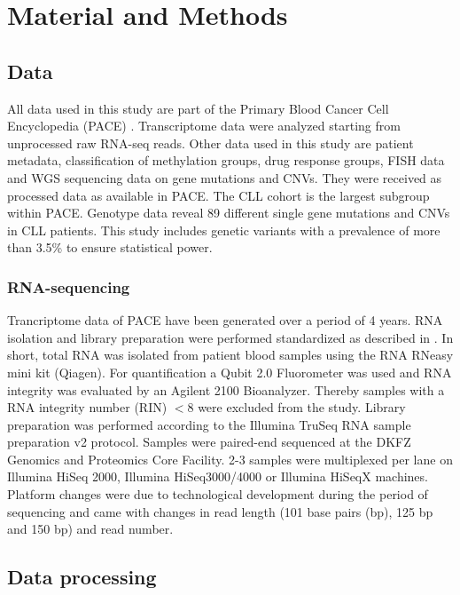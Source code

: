 

\section{Material and Methods}

\subsection{Data}
All data used in this study are part of the Primary Blood Cancer Cell Encyclopedia (PACE) \citep{Dietrich}. Transcriptome data were analyzed starting from unprocessed raw RNA-seq reads. Other data used in this study are patient metadata, classification of methylation groups, drug response groups, FISH data and WGS sequencing data on gene mutations and CNVs. They were received as processed data as available in PACE. The CLL cohort is the largest subgroup within PACE. Genotype data reveal 89 different single gene mutations and CNVs in CLL patients. This study includes genetic variants with a prevalence of more than 3.5\% to ensure statistical power.

\subsubsection{RNA-sequencing}
Trancriptome data of PACE have been generated over a period of 4 years. RNA isolation and library preparation were performed standardized as described in \citet{Dietrich}. In short, total RNA was isolated from patient blood samples using the RNA RNeasy mini kit (Qiagen). For quantification a Qubit 2.0 Fluorometer was used and RNA integrity was evaluated by an Agilent 2100 Bioanalyzer. Thereby samples with a RNA integrity number (RIN) $< 8$ were excluded from the study. Library preparation was performed according to the Illumina TruSeq RNA sample preparation v2 protocol. 
Samples were paired-end sequenced at the DKFZ Genomics and Proteomics Core Facility. 2-3 samples were multiplexed per lane on Illumina HiSeq 2000, Illumina HiSeq3000/4000 or Illumina HiSeqX machines. Platform changes were due to technological development during the period of sequencing and came with changes in read length (101 base pairs (bp), 125 bp and 150 bp) and read number.  

\subsection{Data processing}

